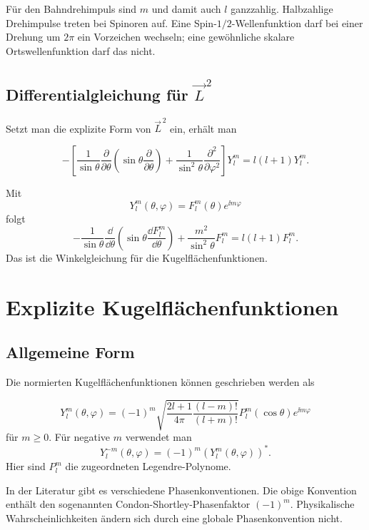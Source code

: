 \begin{conceptbox}
Für den Bahndrehimpuls sind \(m\) und damit auch \(l\) ganzzahlig. Halbzahlige Drehimpulse treten bei Spinoren auf. Eine Spin-\(1/2\)-Wellenfunktion darf bei einer Drehung um \(2\pi\) ein Vorzeichen wechseln; eine gewöhnliche skalare Ortswellenfunktion darf das nicht.
\end{conceptbox}

\subsection{Differentialgleichung für \(\vec L^{\,2}\)}

Setzt man die explizite Form von \(\vec L^{\,2}\) ein, erhält man
\begin{formulabox}
\[
    -\left[
    \frac{1}{\sin\theta}\frac{\partial}{\partial\theta}
    \left(\sin\theta\frac{\partial}{\partial\theta}\right)
    +\frac{1}{\sin^2\theta}\frac{\partial^2}{\partial\varphi^2}
    \right]Y_l^m
    =l(l+1)Y_l^m.
\]
\end{formulabox}

Mit
\[
    Y_l^m(\theta,\varphi)=F_l^m(\theta)e^{\ii m\varphi}
\]
folgt
\[
    -\frac{1}{\sin\theta}\frac{\dd}{\dd\theta}
    \left(\sin\theta\frac{\dd F_l^m}{\dd\theta}\right)
    +\frac{m^2}{\sin^2\theta}F_l^m
    =l(l+1)F_l^m.
\]
Das ist die Winkelgleichung für die Kugelflächenfunktionen.

\section{Explizite Kugelflächenfunktionen}

\subsection{Allgemeine Form}

Die normierten Kugelflächenfunktionen können geschrieben werden als
\begin{formulabox}
\[
    Y_l^m(\theta,\varphi)
    =(-1)^m\sqrt{\frac{2l+1}{4\pi}\frac{(l-m)!}{(l+m)!}}
    P_l^m(\cos\theta)e^{\ii m\varphi}
\]
für \(m\geq 0\). Für negative \(m\) verwendet man
\[
    Y_l^{-m}(\theta,\varphi)=(-1)^m\left(Y_l^m(\theta,\varphi)\right)^*.
\]
Hier sind \(P_l^m\) die zugeordneten Legendre-Polynome.
\end{formulabox}

\begin{notebox}
In der Literatur gibt es verschiedene Phasenkonventionen. Die obige Konvention enthält den sogenannten Condon-Shortley-Phasenfaktor \((-1)^m\). Physikalische Wahrscheinlichkeiten ändern sich durch eine globale Phasenkonvention nicht.
\end{notebox}

